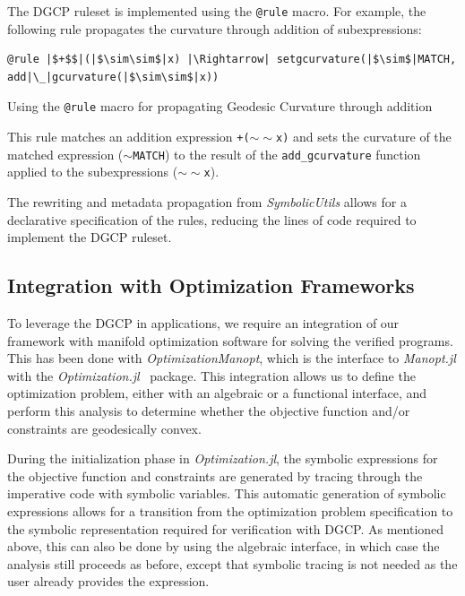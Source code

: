 \documentclass[twoside,11pt]{article}
\begin{document}
The DGCP ruleset is implemented using the \texttt{@rule} macro. For example, the following rule propagates the curvature through addition of subexpressions:

\begin{listing}[h!]
\label{rulecurv}
\begin{verbatim}
@rule |$+$$|(|$\sim\sim$|x) |\Rightarrow| setgcurvature(|$\sim$|MATCH, add|\_|gcurvature(|$\sim\sim$|x))
\end{verbatim}
\caption{Using the \texttt{@rule} macro for propagating Geodesic Curvature through addition}
\end{listing}

This rule matches an addition expression \texttt{+($\sim\sim$x)} and sets the curvature of the matched expression (\texttt{$\sim$MATCH}) to the result of the \texttt{add\_gcurvature} function applied to the subexpressions (\texttt{$\sim\sim$x}).

The rewriting and metadata propagation from \textsl{SymbolicUtils} allows for a declarative specification of the rules, reducing the lines of code required to implement the DGCP ruleset.

\subsection{Integration with Optimization Frameworks}

To leverage the DGCP in applications, we require an integration of our framework with manifold optimization software for solving the verified programs. This has been done with \textsl{OptimizationManopt}, which is the interface to \textsl{Manopt.jl} with the \textsl{Optimization.jl}~\citep{vaibhav_kumar_dixit_2023_7738525} package. This integration allows us to define the optimization problem, either with an algebraic or a functional interface, and perform this analysis to determine whether the objective function and/or constraints are geodesically convex.

During the initialization phase in \textsl{Optimization.jl}, the symbolic expressions for the objective function and constraints are generated by tracing through the imperative code with symbolic variables. This automatic generation of symbolic expressions allows for a transition from the optimization problem specification to the symbolic representation required for verification with DGCP. As mentioned above, this can also be done by using the algebraic interface, in which case the analysis still proceeds as before, except that symbolic tracing is not needed as the user already provides the expression.
\end{document}

